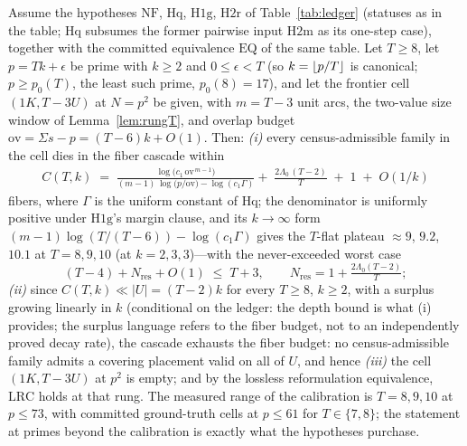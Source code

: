 \begin{theorem}\label{thm:SC}
Assume the hypotheses $\mathrm{NF}$, $\mathrm{Hq}$, $\mathrm{H1g}$,
$\mathrm{H2r}$ of Table~\ref{tab:ledger} (statuses as in the table;
$\mathrm{Hq}$ subsumes the former pairwise input $\mathrm{H2m}$ as its
one-step case), together with the committed equivalence $\mathrm{EQ}$
of the same table. Let $T\ge 8$, let $p=Tk+\epsilon$ be prime with
$k\ge 2$ and $0\le\epsilon<T$ (so $k=\left\lfloor p/T \right\rfloor$ is canonical; $p\ge
p_0(T)$, the least such prime, $p_0(8)=17$), and let the frontier cell
$(1K,T{-}3U)$ at $N=p^2$ be given, with $m=T-3$ unit arcs, the
two-value size window of Lemma~\ref{lem:rungT}, and overlap budget
$\mathrm{ov}=\Sigma s-p=(T-6)k+O(1)$. Then:
\smallskip
\emph{(i)} every census-admissible family in the cell dies in the fiber
cascade within
\begin{multline*}
C(T,k)\;=\;
\frac{\log\!\bigl(c_1\,\mathrm{ov}^{\,m-1}\bigr)}
     {(m-1)\,\log\!\bigl(p/\mathrm{ov}\bigr)-\log(c_1\Gamma)}
+\;\frac{2\Lambda_0\,(T-2)}{T}\;+\;1\;+\;O(1/k)
\end{multline*}
fibers, where $\Gamma$ is the uniform constant of $\mathrm{Hq}$; the
denominator is uniformly positive under $\mathrm{H1g}$'s margin clause,
and its $k\to\infty$ form $(m-1)\log(T/(T-6))-\log(c_1\Gamma)$ gives
the $T$-flat plateau $\approx 9$, $9.2$, $10.1$ at $T=8,9,10$ (at
$k=2,3,3$)---with the never-exceeded worst case
\[
(T-4)+N_{\mathrm{res}}+O(1)\;\le\;T+3,
\qquad
N_{\mathrm{res}}=1+\tfrac{2\Lambda_0(T-2)}{T};
\]
\smallskip
\emph{(ii)} since $C(T,k)\ll|U|=(T-2)k$ for every $T\ge 8$, $k\ge 2$,
with a surplus growing linearly in $k$ (conditional on the ledger: the
depth bound is what (i) provides; the surplus language refers to the
fiber budget, not to an independently proved decay rate), the cascade
exhausts the fiber budget: no census-admissible family admits a
covering placement valid on all of $U$, and hence
\smallskip
\emph{(iii)} the cell $(1K,T{-}3U)$ at $p^2$ is empty; and by the
lossless reformulation equivalence, $\mathrm{LRC}$ holds at that rung.
The measured range of the calibration is $T=8,9,10$ at $p\le 73$, with
committed ground-truth cells at $p\le 61$ for $T\in\{7,8\}$; the
statement at primes beyond the calibration is exactly what the
hypotheses purchase.
\end{theorem}

